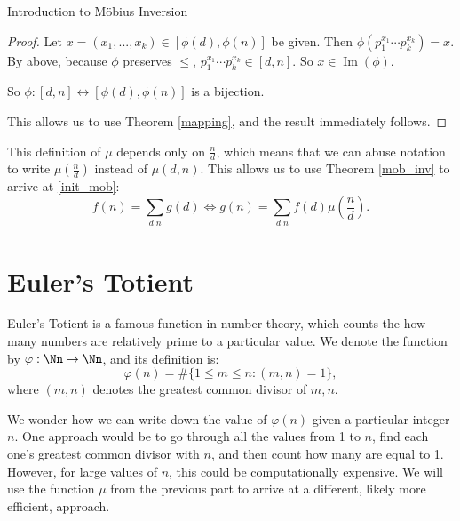 \documentclass[12pt]{pom_thesis}
\DeclareMathOperator{\im}{Im}
\begin{document}
\begin{chapter}{Introduction to M\"obius Inversion}
\begin{proof}
Let $x = (x_1,...,x_k) \in [\phi(d), \phi(n)]$ be given. Then $\phi(p_1^{x_1}\cdots p_k^{x_k}) = x$. By above, because $\phi$ preserves $\leq$, $p_1^{x_1}\cdots p_k^{x_k} \in [d,n]$. So $x \in \im(\phi)$. 

So $\phi:[d,n] \leftrightarrow [\phi(d), \phi(n)]$ is a bijection.

This allows us to use Theorem \ref{mapping}, and the result immediately follows.
\end{proof}

This definition of $\mu$ depends only on $\frac nd$, which means that we can abuse notation to write $\mu(\frac nd)$ instead of $\mu(d,n)$. This allows us to use Theorem \ref{mob_inv} to arrive at \eqref{init_mob}:
\[
f(n) = \sum_{d | n} g(d) \iff g(n) = \sum_{d | n}  f(d)\mu\left(\frac nd\right).
\]
\section{Euler's Totient} %
Euler's Totient is a famous function in number theory, which counts the how many numbers are relatively prime to a particular value. We denote the function by $\varphi : \Nn \rightarrow \Nn$, and its definition is:
\[
\varphi(n) = \#\{1 \leq m \leq n : (m,n) = 1\},
\]
where $(m,n)$ denotes the greatest common divisor of $m,n$.

We wonder how we can write down the value of $\varphi(n)$ given a particular integer $n$. One approach would be to go through all the values from 1 to $n$, find each one's greatest common divisor with $n$, and then count how many are equal to 1. However, for large values of $n$, this could be computationally expensive. We will use the function $\mu$ from the previous part to arrive at a different, likely more efficient, approach.


\end{chapter}
\end{document}
